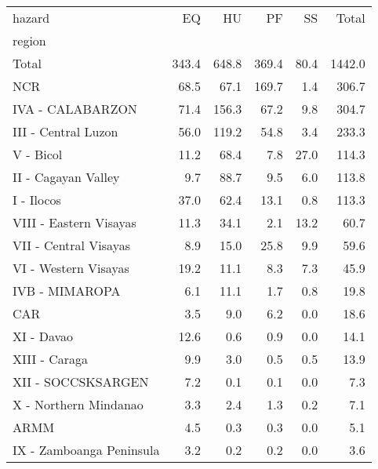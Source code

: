 \begin{tabular}{lrrrrr}
\toprule
hazard &     EQ &     HU &     PF &    SS &   Total \\
region                   &        &        &        &       &         \\
\midrule
Total                    &  343.4 &  648.8 &  369.4 &  80.4 &  1442.0 \\
NCR                      &   68.5 &   67.1 &  169.7 &   1.4 &   306.7 \\
IVA - CALABARZON         &   71.4 &  156.3 &   67.2 &   9.8 &   304.7 \\
III - Central Luzon      &   56.0 &  119.2 &   54.8 &   3.4 &   233.3 \\
V - Bicol                &   11.2 &   68.4 &    7.8 &  27.0 &   114.3 \\
II - Cagayan Valley      &    9.7 &   88.7 &    9.5 &   6.0 &   113.8 \\
I - Ilocos               &   37.0 &   62.4 &   13.1 &   0.8 &   113.3 \\
VIII - Eastern Visayas   &   11.3 &   34.1 &    2.1 &  13.2 &    60.7 \\
VII - Central Visayas    &    8.9 &   15.0 &   25.8 &   9.9 &    59.6 \\
VI - Western Visayas     &   19.2 &   11.1 &    8.3 &   7.3 &    45.9 \\
IVB - MIMAROPA           &    6.1 &   11.1 &    1.7 &   0.8 &    19.8 \\
CAR                      &    3.5 &    9.0 &    6.2 &   0.0 &    18.6 \\
XI - Davao               &   12.6 &    0.6 &    0.9 &   0.0 &    14.1 \\
XIII - Caraga            &    9.9 &    3.0 &    0.5 &   0.5 &    13.9 \\
XII - SOCCSKSARGEN       &    7.2 &    0.1 &    0.1 &   0.0 &     7.3 \\
X - Northern Mindanao    &    3.3 &    2.4 &    1.3 &   0.2 &     7.1 \\
ARMM                     &    4.5 &    0.3 &    0.3 &   0.0 &     5.1 \\
IX - Zamboanga Peninsula &    3.2 &    0.2 &    0.2 &   0.0 &     3.6 \\
\bottomrule
\end{tabular}
